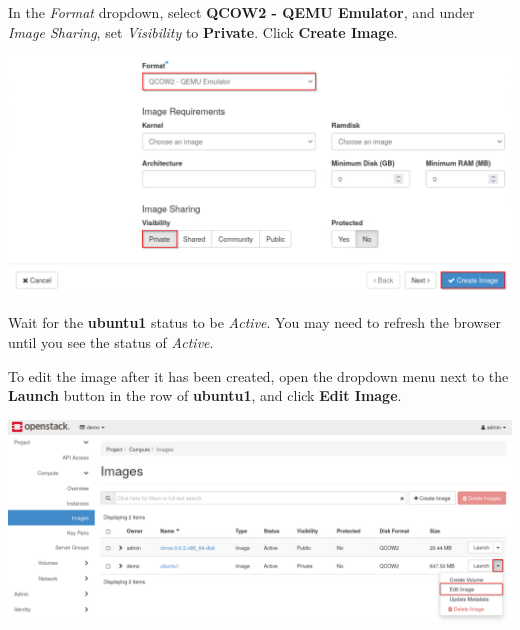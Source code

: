 \documentclass[letterpaper, 12pt]{article}
\begin{document}
\begin{enumerate}
    \begin{labstep}
        In the \textit{Format} dropdown, select \textbf{QCOW2 - QEMU Emulator}, and under \textit{Image Sharing}, set \textit{Visibility} to \textbf{Private}. %
        Click \textbf{Create Image}.

        \begin{center}
            \includegraphics[width=\linewidth]{images/part1/step8.png}
        \end{center}
    \end{labstep}

    \begin{stopbox}
        Wait for the \textbf{ubuntu1} status to be \textit{Active}.
        You may need to refresh the browser until you see the status of \textit{Active}.
    \end{stopbox}

    \begin{labstep}
        To edit the image after it has been created, open the dropdown menu next to the \textbf{Launch} button in the row of \textbf{ubuntu1}, and click \textbf{Edit Image}.

        \begin{center}
            \includegraphics[width=\linewidth]{images/part1/step9.png}
        \end{center}
    \end{labstep}


\end{enumerate}
\end{document}
